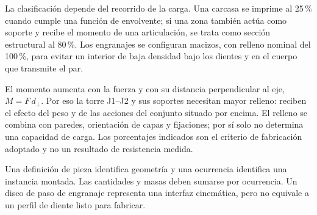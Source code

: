 La clasificación depende del recorrido de la carga. Una carcasa se imprime al 25\,\% cuando cumple una función de envolvente; si una zona también actúa como soporte y recibe el momento de una articulación, se trata como sección estructural al 80\,\%. Los engranajes se configuran macizos, con relleno nominal del 100\,\%, para evitar un interior de baja densidad bajo los dientes y en el cuerpo que transmite el par.

El momento aumenta con la fuerza y con su distancia perpendicular al eje, $M=F\,d_{\perp}$. Por eso la torre J1--J2 y sus soportes necesitan mayor relleno: reciben el efecto del peso y de las acciones del conjunto situado por encima. El relleno se combina con paredes, orientación de capas y fijaciones; por sí solo no determina una capacidad de carga. Los porcentajes indicados son el criterio de fabricación adoptado y no un resultado de resistencia medida.

Una definición de pieza identifica geometría y una ocurrencia identifica una instancia montada. Las cantidades y masas deben sumarse por ocurrencia. Un disco de paso de engranaje representa una interfaz cinemática, pero no equivale a un perfil de diente listo para fabricar.
\FloatBarrier

